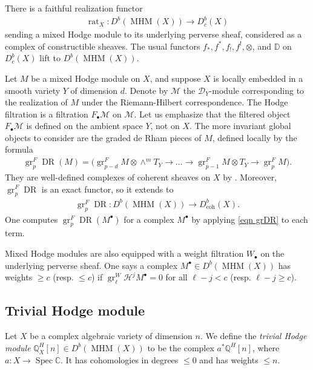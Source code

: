 \documentclass[11pt]{amsart}
\theoremstyle{definition}
\theoremstyle{plain}
\DeclareMathOperator{\gr}{gr}
\DeclareMathOperator{\MHM}{MHM}
\DeclareMathOperator{\dr}{DR}
\DeclareMathOperator{\coh}{coh}
\DeclareMathOperator{\rat}{rat}
\begin{document}
There is a faithful realization functor 
\begin{align*}
    \rat_X: D^b(\MHM(X)) \rightarrow D^b_{c}(X)
\end{align*}
sending a mixed Hodge module to its underlying perverse sheaf, considered as a complex of constructible sheaves. The usual functors $f_*, f^*, f_!, f^!, \otimes$, and $\mathbb{D}$ on $D^b_c(X)$ lift to $D^b(\MHM(X))$.

Let $M$ be a mixed Hodge module on $X$, and suppose $X$ is locally embedded in a smooth variety $Y$ of dimension $d$. Denote by $\mathcal{M}$ the $\mathcal{D}_Y$-module corresponding to the realization of $M$ under the Riemann-Hilbert correspondence. The Hodge filtration is a filtration $F_\bullet \mathcal{M}$ on $\mathcal{M}$. Let us emphasize that the filtered object $F_\bullet \mathcal{M}$ is defined on the ambient space $Y$, not on $X$. The more invariant global objects to consider are the graded de Rham pieces of $M$, defined locally by the formula
\begin{align}\label{eqn grDR}
    \gr_{p}^F \dr(M) = \big( \gr_{p-d}^F M \otimes \wedge^m T_Y \rightarrow \ldots \rightarrow \gr_{p-1}^F M \otimes T_Y \rightarrow \gr_{p}^F M \big).
\end{align}
They are well-defined complexes of coherent sheaves on $X$ by \cite[Proposition $2.33$]{saito 90}. Moreover, $\gr_p^F \dr$ is an exact functor, so it extends to 
\begin{align*}
    \gr_p^F \dr : D^b(\MHM(X)) \rightarrow D^b_{\coh}(X).
\end{align*}
One computes $\gr_p^F \dr( M^\bullet) $ for a complex $M^\bullet$ by applying \ref{eqn grDR} to each term.

Mixed Hodge modules are also equipped with a weight filtration $W_\bullet$ on the underlying perverse sheaf. One says a complex $M^\bullet \in D^b(\MHM(X))$ has weights $\geq c$ (resp. $\leq c$) if $\gr_\ell^W \mathcal{H}^j M^\bullet = 0$ for all $\ell - j < c$ (resp. $\ell - j \geq c$).

\subsection{Trivial Hodge module}

Let $X$ be a complex algebraic variety of dimension $n$. We define the \emph{trivial Hodge module} $\mathbb{Q}_X^H[n] \in D^b(\MHM(X))$ to be the complex $a^* \mathbb{Q}^H[n]$, where $a: X \rightarrow \mathop{\mathrm{Spec}} \mathbb{C}$. It has cohomologies in degrees $\leq 0$ and has weights $\leq n$. 
\end{document}

